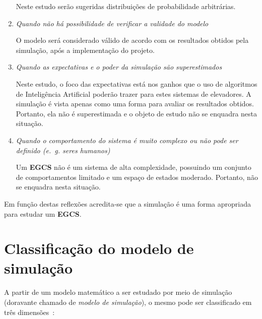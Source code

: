 \begin{enumerate}
Neste estudo serão sugeridas distribuições de probabilidade arbitrárias.

\item \textit{Quando não há possibilidade de verificar a validade do modelo}

O modelo será considerado válido de acordo com os resultados obtidos pela
simulação, após a implementação do projeto.

\item \textit{Quando as expectativas e o poder da simulação são superestimados}

Neste estudo, o foco das expectativas está nos ganhos que o uso de algoritmos de
Inteligência Artificial poderão trazer para estes sistemas de elevadores. A
simulação é vista apenas como uma forma para avaliar os resultados obtidos.
Portanto, ela não é superestimada e o objeto de estudo não se enquadra nesta
situação.

\item \textit{Quando o comportamento do sistema é muito complexo ou não pode ser
definido (e.~g. seres humanos)}

Um \textbf{EGCS} não é um sistema de alta complexidade, possuindo um conjunto de
comportamentos limitado e um espaço de estados moderado. Portanto, não se
enquadra nesta situação.

\end{enumerate}

Em função destas reflexões acredita-se que a simulação é uma forma apropriada
para estudar um \textbf{EGCS}.

\section{Classificação do modelo de simulação}

A partir de um modelo matemático a ser estudado por meio de simulação (doravante
chamado de \textit{modelo de simulação}), o mesmo pode ser classificado em três
dimensões~\cite{Banks,Law}:


